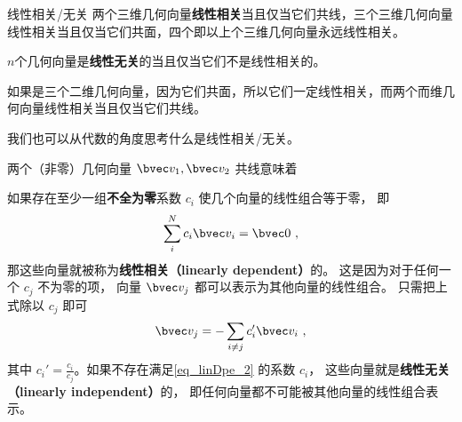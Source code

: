 
\begin{issues}
\issueDraft
\end{issues}


% 

\begin{definition}{线性相关/无关}\label{def_linDpe_1}
两个三维几何向量\textbf{线性相关}当且仅当它们共线，三个三维几何向量线性相关当且仅当它们共面，四个即以上个三维几何向量永远线性相关。

$n$个几何向量是\textbf{线性无关}的当且仅当它们不是线性相关的。
\end{definition}

如果是三个二维几何向量，因为它们共面，所以它们一定线性相关，而两个而维几何向量线性相关当且仅当它们共线。

我们也可以从代数的角度思考什么是线性相关/无关。

两个（非零）几何向量 $\bvec v_1, \bvec v_2$ 共线意味着

如果存在至少一组\textbf{不全为零}系数 $c_i$ 使几个向量的线性组合等于零， 即
\begin{equation}\label{eq_linDpe_2}
\sum_i^N c_i \bvec v_i = \bvec 0~,
\end{equation}
那这些向量就被称为\textbf{线性相关（linearly dependent）}的。 这是因为对于任何一个 $c_j$ 不为零的项， 向量 $\bvec v_j$ 都可以表示为其他向量的线性组合。 只需把上式除以 $c_j$ 即可
\begin{equation}\label{eq_linDpe_3}
\bvec v_j = -\sum_{i \ne j} c_i' \bvec v_i~,
\end{equation}
其中 $c_i' = \frac{c_i}{c_j}$。如果不存在满足\autoref{eq_linDpe_2} 的系数 $c_i$， 这些向量就是\textbf{线性无关（linearly independent）}的， 即任何向量都不可能被其他向量的线性组合表示。

